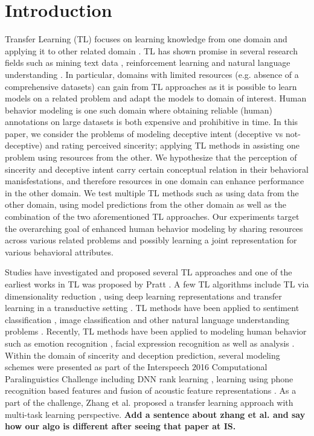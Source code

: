 \documentclass{article}
\begin{document}
\section{Introduction}
\label{sec:intro}
Transfer Learning (TL) focuses on learning knowledge from one domain and applying it to other related domain \cite{pan2010survey}. 
TL has shown promise in several research fields such as mining text data \cite{aggarwal2012mining}, reinforcement learning \cite{taylor2009transfer} and natural language understanding \cite{blitzer2007biographies}.  
In particular, domains with limited resources (e.g. absence of a comprehensive datasets) can gain from TL approaches as it is possible to learn models on a related problem and adapt the models to domain of interest. 
Human behavior modeling \cite{luo2008agent,narayanan2013behavioral} is one such domain where obtaining reliable (human) annotations on large datasets is both expensive and prohibitive in time.
In this paper, we consider the problems of modeling deceptive intent (deceptive vs not-deceptive) and rating perceived sincerity; applying TL methods in assisting one problem using resources from the other. 
We hypothesize that the perception of sincerity and deceptive intent carry certain conceptual relation in their behavioral manisfestations, and therefore resources in one domain can enhance performance in the other domain.
We test multiple TL methods such as using data from the other domain, using model predictions from the other domain as well as the combination of the two aforementioned TL approaches. 
Our experiments target the overarching goal of enhanced human behavior modeling by sharing resources across various related problems and possibly learning a joint representation for various behavioral attributes. 

Studies have investigated and proposed several TL approaches \cite{pan2010survey} and one of the earliest works in TL was proposed by Pratt \cite{pratt1993discriminability}.
A few TL algorithms include TL via dimensionality reduction \cite{pan2008transfer}, using deep learning representations \cite{bengio2012deep, mesnil2012unsupervised} and transfer learning in a transductive setting \cite{rohrbach2013transfer}.  
TL methods have been applied to sentiment classification \cite{blitzer2007biographies}, image classification \cite{wu2004improving} and other natural language understanding problems \cite{arnold2007comparative,blitzer2006domain}. 
Recently, TL methods have been applied to modeling human behavior such as emotion recognition \cite{zhang2016enhanced}, facial expression recognition \cite{chen2013learning} as well as analysis \cite{sangineto2014we}.
Within the domain of sincerity and deception prediction, several modeling schemes were presented as part of the Interspeech 2016 Computational Paralinguistics Challenge \cite{schuller2016interspeech} including DNN rank learning \cite{gabor2016sinc}, learning using phone recognition based features \cite{herms2016sinc} and fusion of acoustic feature representations \cite{kaya2016sinc}.  
As a part of the challenge, Zhang et al. \cite{zhang2016sinc} proposed a transfer learning approach with multi-task learning perspective.
{\bf Add a sentence about zhang et al. and say how our algo is different after seeing that paper at IS.} 
\end{document}
